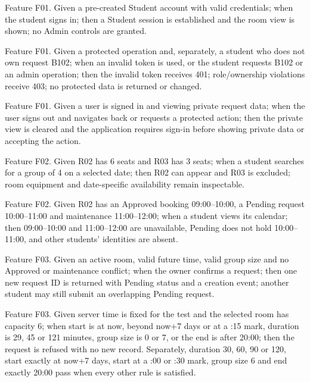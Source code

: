 \begin{description}[style=nextline,leftmargin=0pt,labelindent=0pt,labelsep=0pt,font=\bfseries,itemsep=4pt]
\item[AC-01 Valid sign in] Feature F01. Given a pre-created Student account with valid credentials; when the student signs in; then a Student session is established and the room view is shown; no Admin controls are granted.
\item[AC-02 Invalid identity and unauthorized access] Feature F01. Given a protected operation and, separately, a student who does not own request B102; when an invalid token is used, or the student requests B102 or an admin operation; then the invalid token receives 401; role/ownership violations receive 403; no protected data is returned or changed.
\item[AC-03 Sign out] Feature F01. Given a user is signed in and viewing private request data; when the user signs out and navigates back or requests a protected action; then the private view is cleared and the application requires sign-in before showing private data or accepting the action.
\item[AC-04 Capacity and date filtering] Feature F02. Given R02 has 6 seats and R03 has 3 seats; when a student searches for a group of 4 on a selected date; then R02 can appear and R03 is excluded; room equipment and date-specific availability remain inspectable.
\item[AC-05 Public availability] Feature F02. Given R02 has an Approved booking 09:00--10:00, a Pending request 10:00--11:00 and maintenance 11:00--12:00; when a student views its calendar; then 09:00--10:00 and 11:00--12:00 are unavailable, Pending does not hold 10:00--11:00, and other students' identities are absent.
\item[AC-06 Pending submission] Feature F03. Given an active room, valid future time, valid group size and no Approved or maintenance conflict; when the owner confirms a request; then one new request ID is returned with Pending status and a creation event; another student may still submit an overlapping Pending request.
\item[AC-07 Boundary validation] Feature F03. Given server time is fixed for the test and the selected room has capacity 6; when start is at now, beyond now+7 days or at a :15 mark, duration is 29, 45 or 121 minutes, group size is 0 or 7, or the end is after 20:00; then the request is refused with no new record. Separately, duration 30, 60, 90 or 120, start exactly at now+7 days, start at a :00 or :30 mark, group size 6 and end exactly 20:00 pass when every other rule is satisfied.

\end{description}
